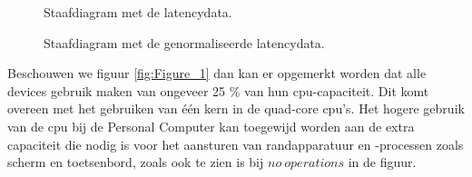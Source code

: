 	



	\begin{figure}
		\caption{Staafdiagram met de latencydata.}
		\label{fig:Figure_0}
	\end{figure}

	\begin{figure}
		\caption{Staafdiagram met de genormaliseerde latencydata.}
		\label{fig:Figure_2}
	\end{figure}
	
	Beschouwen we figuur \ref{fig:Figure_1} dan kan er opgemerkt worden dat alle devices gebruik maken van ongeveer 25 \% van hun \gls{cpu}-capaciteit. Dit komt overeen met het gebruiken van \'e\'en kern in de quad-core \gls{cpu}'s. Het hogere gebruik van de \gls{cpu} bij de Personal Computer kan toegewijd worden aan de extra capaciteit die nodig is voor het aansturen van randapparatuur en -processen zoals scherm en toetsenbord, zoals ook te zien is bij $no~operations$ in de figuur.

